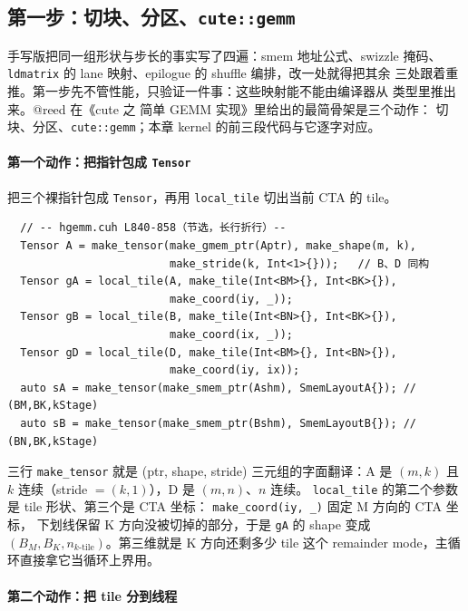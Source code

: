 \subsection{第一步：切块、分区、\texttt{cute::gemm}}\label{sec:24-step1}

手写版把同一组形状与步长的事实写了四遍：smem 地址公式、swizzle 掩码、
\texttt{ldmatrix} 的 lane 映射、epilogue 的 shuffle 编排，改一处就得把其余
三处跟着重推。第一步先不管性能，只验证一件事：这些映射能不能由编译器从
类型里推出来。@reed 在《cute 之 简单 GEMM 实现》里给出的最简骨架是三个动作：
切块、分区、\texttt{cute::gemm}；本章 kernel 的前三段代码与它逐字对应。

\paragraph{第一个动作：把指针包成 \texttt{Tensor}}

把三个裸指针包成 \texttt{Tensor}，再用
\texttt{local\_tile} 切出当前 CTA 的 tile。

\begin{lstlisting}
  // -- hgemm.cuh L840-858（节选，长行折行）--
  Tensor A = make_tensor(make_gmem_ptr(Aptr), make_shape(m, k),
                         make_stride(k, Int<1>{}));   // B、D 同构
  Tensor gA = local_tile(A, make_tile(Int<BM>{}, Int<BK>{}),
                         make_coord(iy, _));
  Tensor gB = local_tile(B, make_tile(Int<BN>{}, Int<BK>{}),
                         make_coord(ix, _));
  Tensor gD = local_tile(D, make_tile(Int<BM>{}, Int<BN>{}),
                         make_coord(iy, ix));
  auto sA = make_tensor(make_smem_ptr(Ashm), SmemLayoutA{}); // (BM,BK,kStage)
  auto sB = make_tensor(make_smem_ptr(Bshm), SmemLayoutB{}); // (BN,BK,kStage)
\end{lstlisting}

三行 \texttt{make\_tensor} 就是 (ptr, shape, stride) 三元组的字面翻译：A 是
$(m,k)$ 且 $k$ 连续（stride $=(k,1)$），D 是 $(m,n)$、$n$ 连续。
\texttt{local\_tile} 的第二个参数是 tile 形状、第三个是 CTA 坐标：
\texttt{make\_\allowbreak{}coord\allowbreak{}(iy,\allowbreak{} \_\allowbreak{})} 固定 M 方向的 CTA 坐标，
下划线保留 K 方向没被切掉的部分，于是 \texttt{gA} 的 shape 变成
$(B_M, B_K, n_{k\text{-tile}})$。第三维就是 K 方向还剩多少 tile 这个 remainder
mode，主循环直接拿它当循环上界用。

\paragraph{第二个动作：把 tile 分到线程}

